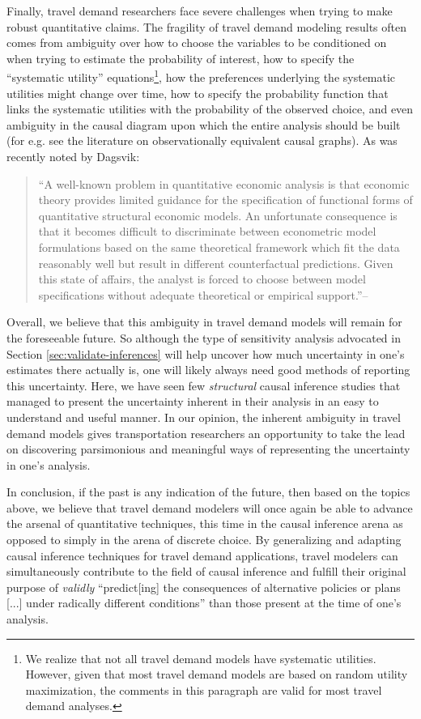 Finally, travel demand researchers face severe challenges when trying to make robust quantitative claims. The fragility of travel demand modeling results often comes from ambiguity over how to choose the variables to be conditioned on when trying to estimate the probability of interest, how to specify the ``systematic utility'' equations\footnote{We realize that not all travel demand models have systematic utilities. However, given that most travel demand models are based on random utility maximization, the comments in this paragraph are valid for most travel demand analyses.}, how the preferences underlying the systematic utilities might change over time, how to specify the probability function that links the systematic utilities with the probability of the observed choice, and even ambiguity in the causal diagram upon which the entire analysis should be built (for e.g. see the literature on observationally equivalent causal graphs). As was recently noted by Dagsvik:
\begin{quotation}
``A well-known problem in quantitative economic analysis is that economic theory provides limited guidance for the specification of functional forms of quantitative structural economic models. An unfortunate consequence is that it becomes difficult to discriminate between econometric model formulations based on the same theoretical framework which fit the data reasonably well but result in different counterfactual predictions. Given this state of affairs, the analyst is forced to choose between model specifications without adequate theoretical or empirical support.''--\citep{dagsvik_2017_invariance}
\end{quotation}
Overall, we believe that this ambiguity in travel demand models will remain for the foreseeable future. So although the type of sensitivity analysis advocated in Section \ref{sec:validate-inferences} will help uncover how much uncertainty in one's estimates there actually is, one will likely always need good methods of reporting this uncertainty. Here, we have seen few \textit{structural} causal inference studies that managed to present the uncertainty inherent in their analysis in an easy to understand and useful manner. In our opinion, the inherent ambiguity in travel demand models gives transportation researchers an opportunity to take the lead on discovering parsimonious and meaningful ways of representing the uncertainty in one's analysis.

In conclusion, if the past is any indication of the future, then based on the topics above, we believe that travel demand modelers will once again be able to advance the arsenal of quantitative techniques, this time in the causal inference arena as opposed to simply in the arena of discrete choice. By generalizing and adapting causal inference techniques for travel demand applications, travel modelers can simultaneously contribute to the field of causal inference and fulfill their original purpose of \textit{validly} ``predict[ing] the consequences of alternative policies or plans [...] under radically different conditions'' than those present at the time of one's analysis.

